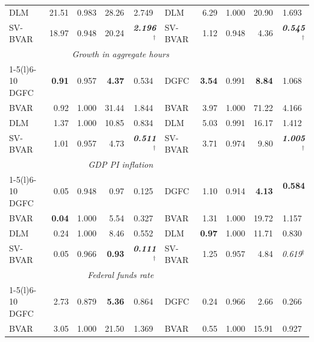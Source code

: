 \begin{tabular}{@{}lrrrr@{\qquad}lrrrr@{}}
DLM       & 21.51 & 0.983 & 28.26 & 2.749$^{\phantom{\dagger}}$ & DLM       & 6.29 & 1.000 & 20.90 & 1.693$^{\phantom{\dagger}}$ \\
SV-BVAR   & 18.97 & 0.948 & 20.24 & \textit{\textbf{2.196}}$^{\dagger}$ & SV-BVAR   & 1.12 & 0.948 & 4.36 & \textit{\textbf{0.545}}$^{\dagger}$ \\
\addlinespace
\multicolumn{5}{c}{\textit{Payroll employment growth}} & \multicolumn{5}{c}{\textit{Growth in aggregate hours}} \\
\cmidrule(r){1-5}\cmidrule(l){6-10}
DGFC      & \textbf{0.91} & 0.957 & \textbf{4.37} & 0.534$^{\phantom{\dagger}}$ & DGFC      & \textbf{3.54} & 0.991 & \textbf{8.84} & 1.068$^{\phantom{\dagger}}$ \\
BVAR      & 0.92 & 1.000 & 31.44 & 1.844$^{\phantom{\dagger}}$ & BVAR      & 3.97 & 1.000 & 71.22 & 4.166$^{\phantom{\dagger}}$ \\
DLM       & 1.37 & 1.000 & 10.85 & 0.834$^{\phantom{\dagger}}$ & DLM       & 5.03 & 0.991 & 16.17 & 1.412$^{\phantom{\dagger}}$ \\
SV-BVAR   & 1.01 & 0.957 & 4.73 & \textit{\textbf{0.511}}$^{\dagger}$ & SV-BVAR   & 3.71 & 0.974 & 9.80 & \textit{\textbf{1.005}}$^{\dagger}$ \\
\addlinespace
\multicolumn{5}{c}{\textit{Unemployment rate}} & \multicolumn{5}{c}{\textit{GDP PI inflation}} \\
\cmidrule(r){1-5}\cmidrule(l){6-10}
DGFC      & 0.05 & 0.948 & 0.97 & 0.125$^{\phantom{\dagger}}$ & DGFC      & 1.10 & 0.914 & \textbf{4.13} & \textbf{0.584}$^{\phantom{\dagger}}$ \\
BVAR      & \textbf{0.04} & 1.000 & 5.54 & 0.327$^{\phantom{\dagger}}$ & BVAR      & 1.31 & 1.000 & 19.72 & 1.157$^{\phantom{\dagger}}$ \\
DLM       & 0.24 & 1.000 & 8.46 & 0.552$^{\phantom{\dagger}}$ & DLM       & \textbf{0.97} & 1.000 & 11.71 & 0.830$^{\phantom{\dagger}}$ \\
SV-BVAR   & 0.05 & 0.966 & \textbf{0.93} & \textit{\textbf{0.111}}$^{\dagger}$ & SV-BVAR   & 1.25 & 0.957 & 4.84 & \textit{0.619}$^{\dagger}$ \\
\addlinespace
\multicolumn{5}{c}{\textit{PCE inflation}} & \multicolumn{5}{c}{\textit{Federal funds rate}} \\
\cmidrule(r){1-5}\cmidrule(l){6-10}
DGFC      & 2.73 & 0.879 & \textbf{5.36} & 0.864$^{\phantom{\dagger}}$ & DGFC      & 0.24 & 0.966 & 2.66 & 0.266$^{\phantom{\dagger}}$ \\
BVAR      & 3.05 & 1.000 & 21.50 & 1.369$^{\phantom{\dagger}}$ & BVAR      & 0.55 & 1.000 & 15.91 & 0.927$^{\phantom{\dagger}}$ \\

\end{tabular}
